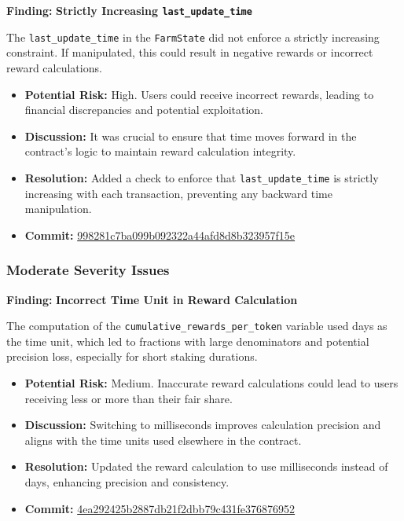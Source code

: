 \documentclass{article}
\begin{document}
\begin{criticalbox}
\textbf{Finding:} \textbf{Strictly Increasing \texttt{last\_update\_time}}

The \texttt{last\_update\_time} in the \texttt{FarmState} did not enforce a strictly increasing constraint. If manipulated, this could result in negative rewards or incorrect reward calculations.

\begin{itemize}[label=$\diamond$]
    \item \textbf{Potential Risk:} High. Users could receive incorrect rewards, leading to financial discrepancies and potential exploitation.
    \item \textbf{Discussion:} It was crucial to ensure that time moves forward in the contract's logic to maintain reward calculation integrity.
    \item \textbf{Resolution:} Added a check to enforce that \texttt{last\_update\_time} is strictly increasing with each transaction, preventing any backward time manipulation.
    \item \textbf{Commit:} \href{https://github.com/MuesliSwapTeam/muesliswap-decentralized-farming/commit/998281c7ba099b092322a44afd8d8b323957f15e}{998281c7ba099b092322a44afd8d8b323957f15e}
\end{itemize}
\end{criticalbox}

\subsubsection{Moderate Severity Issues}

\begin{moderatebox}
\textbf{Finding:} \textbf{Incorrect Time Unit in Reward Calculation}

The computation of the \texttt{cumulative\_rewards\_per\_token} variable used days as the time unit, which led to fractions with large denominators and potential precision loss, especially for short staking durations.

\begin{itemize}[label=$\diamond$]
    \item \textbf{Potential Risk:} Medium. Inaccurate reward calculations could lead to users receiving less or more than their fair share.
    \item \textbf{Discussion:} Switching to milliseconds improves calculation precision and aligns with the time units used elsewhere in the contract.
    \item \textbf{Resolution:} Updated the reward calculation to use milliseconds instead of days, enhancing precision and consistency.
    \item \textbf{Commit:} \href{https://github.com/MuesliSwapTeam/muesliswap-decentralized-farming/commit/4ea292425b2887db21f2dbb79c431fe376876952}{4ea292425b2887db21f2dbb79c431fe376876952}
\end{itemize}
\end{moderatebox}
\end{document}
